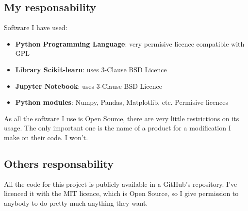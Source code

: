 \documentclass{article}
\begin{document}
    \subsection{My responsability}
    Software I have used:
    \begin{itemize}
        \item \textbf{Python Programming Language}: very permisive licence
        compatible with GPL
        \item \textbf{Library Scikit-learn}: uses 3-Clause BSD Licence
        \item \textbf{Jupyter Notebook}: uses 3-Clause BSD Licence
        \item \textbf{Python modules}: Numpy, Pandas, Matplotlib, etc. Permisive
        licences
    \end{itemize}
    As all the software I use is Open Source, there are very little restrictions
    on its usage. The only important one is the name of a product for a modification
    I make on their code. I won't.
    \subsection{Others responsability}
    All the code for this project is publicly available in a GitHub's repository.
    I've licenced it with the MIT licence, which is Open Source, so I give
    permission to anybody to do pretty much anything they want.
\end{document}
